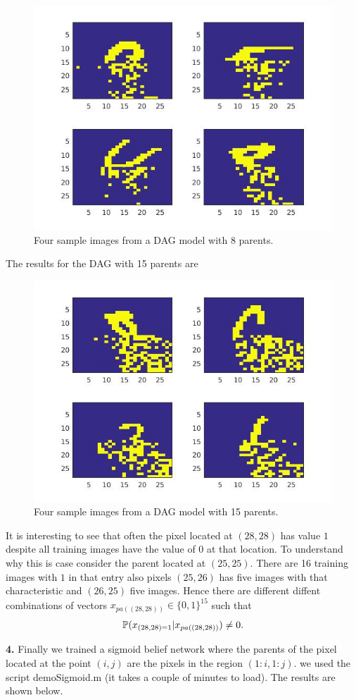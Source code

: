 \documentclass{article}
\begin{document}
\begin{figure}[H]
\centering
\includegraphics[scale=0.5]{DAG8}
\caption{Four sample images from a DAG model with 8 parents.}
\end{figure}

The results for the DAG with 15 parents are

\begin{figure}[H]
\centering
\includegraphics[scale=0.5]{DAG15}
\caption{Four sample images from a DAG model with 15 parents.} 
\end{figure}

It is interesting to see that often the pixel located at $(28,28)$ has value $1$ despite all training images have the value of $0$ at that location.
To understand why this is case consider the parent located at $(25,25)$. There are 16 training images with $1$ in that entry also pixels
$(25,26)$ has five images with that characteristic and $(26,25)$ five images. Hence there are different diffent combinations of vectors
$x_{pa((28,28))}\in\{0,1\}^{15}$ such that
\begin{equation*}
\mathbb{P}(x_{(28,28)=1}|x_{pa((28,28))})\neq 0.
\end{equation*}

\textbf{4.}
Finally we trained a sigmoid belief network where the parents of the pixel located at the point $(i,j)$ are the pixels in the region
$(1:i,1:j)$. we used the script demoSigmoid.m (it takes a couple of minutes to load). The results are shown below.
\end{document}
